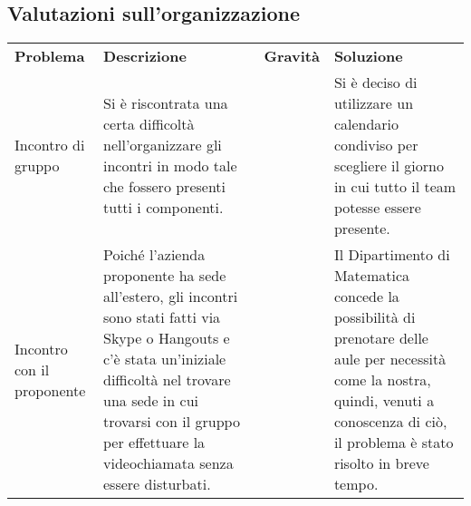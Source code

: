 \subsection{Valutazioni sull'organizzazione}
\begin{table}[H]
	\renewcommand{\arraystretch}{1.5}
	\caption{Tabella delle problematiche relative all'organizzazione}
	\begin{longtable}{ >{\centering}p{} >{}p{}
			>{\centering}p{} >{}p{}}
			
		\rowcolorhead
		\textbf{\color{white}Problema} 
		& \centering\textbf{\color{white}Descrizione} 
		& \centering\textbf{\color{white}Gravità}
		& \textbf{\color{white}Soluzione} 
		\tabularnewline %
		
		Incontro di gruppo &
		Si è riscontrata una certa difficoltà nell'organizzare gli incontri in modo
		tale che fossero presenti tutti i componenti. &
		2 &
		Si è deciso di utilizzare un calendario condiviso per scegliere il giorno
		in cui tutto il team potesse essere presente. 
				
		\tabularnewline 
		Incontro con il proponente &
		Poiché l'azienda proponente ha sede all'estero, gli incontri sono stati fatti 
		via Skype o Hangouts e c'è stata un'iniziale difficoltà nel trovare una sede in cui 
		trovarsi con il gruppo per effettuare la videochiamata senza essere disturbati. &
		1 &
		Il Dipartimento di Matematica concede la possibilità di prenotare delle aule
		per necessità come la nostra, quindi, venuti a conoscenza di ciò, il problema 
		è stato risolto in breve tempo.
			
	\end{longtable}
		
\end{table}

